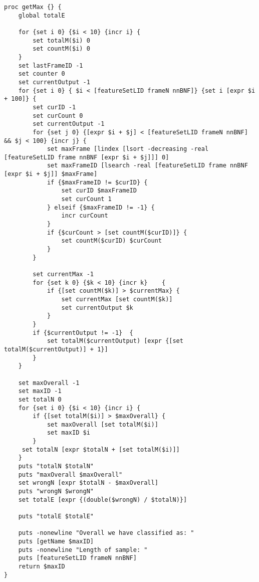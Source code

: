 \begin{lstlisting}[label=lst:SequenceFilter,caption=Sequence Filter employed to smooth/improve output]
proc getMax {} {
    global totalE

    for {set i 0} {$i < 10} {incr i} {
        set totalM($i) 0
        set countM($i) 0
    }
    set lastFrameID -1
    set counter 0
    set currentOutput -1
    for {set i 0} { $i < [featureSetLID frameN nnBNF]} {set i [expr $i + 100]} {
        set curID -1
        set curCount 0
        set currentOutput -1
        for {set j 0} {[expr $i + $j] < [featureSetLID frameN nnBNF] && $j < 100} {incr j} {
            set maxFrame [lindex [lsort -decreasing -real [featureSetLID frame nnBNF [expr $i + $j]]] 0]
            set maxFrameID [lsearch -real [featureSetLID frame nnBNF [expr $i + $j]] $maxFrame]
            if {$maxFrameID != $curID} {
                set curID $maxFrameID
                set curCount 1
            } elseif {$maxFrameID != -1} {
                incr curCount
            }
            if {$curCount > [set countM($curID)]} {
                set countM($curID) $curCount
            }
        }

        set currentMax -1
        for {set k 0} {$k < 10} {incr k}    {
            if {[set countM($k)] > $currentMax} {
                set currentMax [set countM($k)]
                set currentOutput $k
            }
        }
        if {$currentOutput != -1}  {
            set totalM($currentOutput) [expr {[set totalM($currentOutput)] + 1}]
        }
    }

    set maxOverall -1
    set maxID -1
    set totalN 0
    for {set i 0} {$i < 10} {incr i} {
        if {[set totalM($i)] > $maxOverall} {
            set maxOverall [set totalM($i)]
            set maxID $i
        }
     set totalN [expr $totalN + [set totalM($i)]]
    }
    puts "totalN $totalN"
    puts "maxOverall $maxOverall"
    set wrongN [expr $totalN - $maxOverall]
    puts "wrongN $wrongN"
    set totalE [expr {(double($wrongN) / $totalN)}]

    puts "totalE $totalE"

    puts -nonewline "Overall we have classified as: "
    puts [getName $maxID]
    puts -nonewline "Length of sample: "
    puts [featureSetLID frameN nnBNF]
    return $maxID
}
\end{lstlisting}
\newpage
